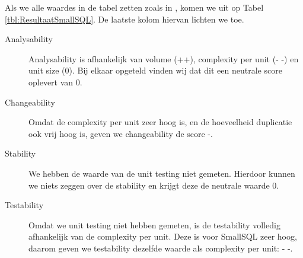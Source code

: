 \documentclass[a4paper]{article}
\begin{document}
Als we alle waardes in de tabel zetten zoals in \cite{A}, komen we uit op Tabel \ref{tbl:ResultaatSmallSQL}. De laatste kolom hiervan lichten we toe.
\begin{description}
\item[Analysability] Analysability is afhankelijk van volume (++), complexity per unit (- -) en unit size (0). Bij elkaar opgeteld vinden wij dat dit een neutrale score oplevert van 0.
\item[Changeability] Omdat de complexity per unit zeer hoog is, en de hoeveelheid duplicatie ook vrij hoog is, geven we changeability de score -.
\item[Stability] We hebben de waarde van de unit testing niet gemeten. Hierdoor kunnen we niets zeggen over de stability en krijgt deze de neutrale waarde 0.
\item[Testability] Omdat we unit testing niet hebben gemeten, is de testability volledig afhankelijk van de complexity per unit. Deze is voor SmallSQL zeer hoog, daarom geven we testability dezelfde waarde als complexity per unit: - -.
\end{description}
\end{document}
